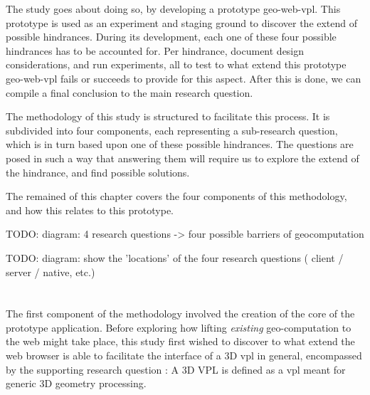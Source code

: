 The study goes about doing so, by developing a prototype \ac{geo-web-vpl}. 
This prototype is used as an experiment and staging ground to discover the extend of possible hindrances. 
During its development, each one of these four possible hindrances has to be accounted for. 
Per hindrance, document design considerations, and run experiments, all to test to what extend this prototype \ac{geo-web-vpl} fails or succeeds to provide for this aspect. 
After this is done, we can compile a final conclusion to the main research question. 

The methodology of this study is structured to facilitate this process. 
It is subdivided into four components, each representing a sub-research question, which is in turn based upon one of these possible hindrances. The questions are posed in such a way that answering them will require us to explore the extend of the hindrance, and find possible solutions.

The remained of this chapter covers the four components of this methodology, and how this relates to this prototype. 

\begin{note}
TODO: diagram: 4 research questions -> four possible barriers of geocomputation
\end{note}

\begin{note}
TODO: diagram: show the 'locations' of the four research questions ( client / server / native, etc.)
\end{note}


\section{\mySubRQOneTitle} 
\label{sec:method-one}

The first component of the methodology involved the creation of the core of the prototype application. 
Before exploring how lifting \emph{existing} geo-computation to the web might take place, this study first wished to discover to what extend the web browser is able to facilitate the interface of a 3D vpl in general, encompassed by the supporting research question : \mySubRQOne
A 3D VPL is defined as a vpl meant for generic 3D geometry processing.

